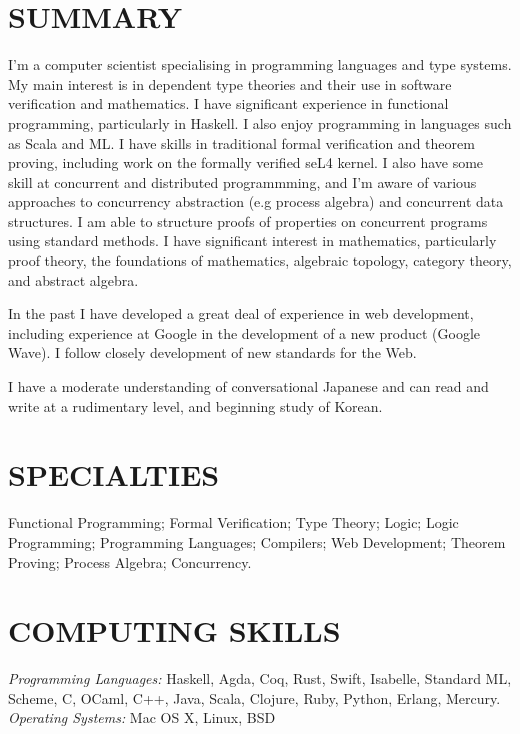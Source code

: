 \documentclass[line,margin]{res}
\begin{document}

 
\begin{resume}
 
\section{SUMMARY}
I'm a computer scientist specialising in programming languages and type systems. My main interest is in dependent type theories and their use in software verification and mathematics. I have significant experience in functional programming, particularly in Haskell. I also enjoy programming in languages such as Scala and ML. I have skills in traditional formal verification and theorem proving, including work on the formally verified seL4 kernel. I also have some skill at concurrent and distributed programmming, and I'm aware of various approaches to concurrency abstraction (e.g process algebra) and concurrent data structures. I am able to structure proofs of properties on concurrent programs using standard methods. I have significant interest in mathematics, particularly proof theory, the foundations of mathematics, algebraic topology, category theory, and abstract algebra.

In the past I have developed a great deal of experience in web development, including experience at Google in the development of a new product (Google Wave). I follow closely development of new standards for the Web.

I have a moderate understanding of conversational Japanese and can read and write at a rudimentary level, and beginning study of Korean.

\section{SPECIALTIES} Functional Programming; Formal Verification; Type Theory; Logic; Logic Programming; Programming Languages; Compilers; Web Development; Theorem Proving; Process Algebra; Concurrency.

\section{COMPUTING SKILLS} {\sl Programming Languages:} Haskell, Agda, Coq, Rust, Swift,
         Isabelle, Standard ML, Scheme, C, OCaml, C++, 
         Java, Scala, Clojure, Ruby, Python, 
         Erlang, Mercury. \\
         {\sl Operating Systems:} Mac OS X, Linux, BSD


\end{resume}
\end{document}
